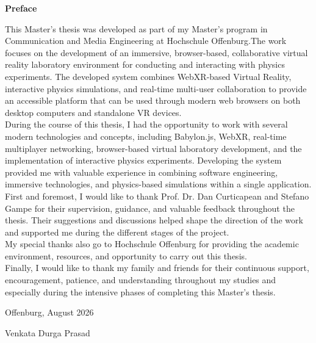 \clearpage
\thispagestyle{plain}


{\Huge\bfseries Preface\par}

\vspace{1.5cm}

This Master’s thesis was developed as part of my Master’s program in Communication and Media Engineering at Hochschule Offenburg.The work focuses on the development of an immersive, browser-based, collaborative virtual reality laboratory environment for conducting and interacting with physics experiments. The developed system combines WebXR-based Virtual Reality, interactive physics simulations, and real-time multi-user collaboration to provide an accessible platform that can be used through modern web browsers on both desktop computers and standalone VR devices.\\

During the course of this thesis, I had the opportunity to work with several modern technologies and concepts, including Babylon.js, WebXR, real-time multiplayer networking, browser-based virtual laboratory development, and the implementation of interactive physics experiments. Developing the system provided me with valuable experience in combining software engineering, immersive technologies, and physics-based simulations within a single application.\\

First and foremost, I would like to thank Prof. Dr. Dan Curticapean and Stefano Gampe for their  supervision, guidance, and valuable feedback throughout the thesis. Their suggestions and discussions helped shape the direction of the work and supported me during the different stages of the project.\\

My special thanks also go to Hochschule Offenburg for providing the academic environment, resources, and opportunity to carry out this thesis.\\

Finally, I would like to thank my family and friends for their continuous support, encouragement, patience, and understanding throughout my studies and especially during the intensive phases of completing this Master’s thesis.


\vspace{1.5cm}

\noindent
Offenburg, August 2026

\vspace{0.25cm}

\noindent
Venkata Durga Prasad